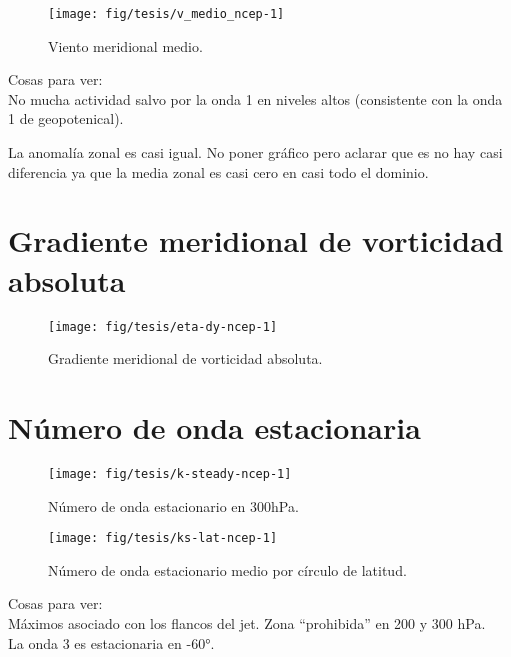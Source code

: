 \documentclass[spanish,a4paper]{book}
\begin{document}
\begin{figure}

{\centering \texttt{[image: fig/tesis/v\_medio\_ncep-1]} 

}

\caption{Viento meridional medio.}\label{fig:v_medio_ncep}
\end{figure}

Cosas para ver:\\
No mucha actividad salvo por la onda 1 en niveles altos (consistente con
la onda 1 de geopotenical).

La anomalía zonal es casi igual. No poner gráfico pero aclarar que es no
hay casi diferencia ya que la media zonal es casi cero en casi todo el
dominio.

\section{Gradiente meridional de vorticidad
absoluta}\label{gradiente-meridional-de-vorticidad-absoluta}

\begin{figure}

{\centering \texttt{[image: fig/tesis/eta-dy-ncep-1]} 

}

\caption{Gradiente meridional de vorticidad absoluta.}\label{fig:eta-dy-ncep}
\end{figure}

\section{Número de onda estacionaria}\label{numero-de-onda-estacionaria}

\begin{figure}
\texttt{[image: fig/tesis/k-steady-ncep-1]} \caption{Número de onda estacionario en 300hPa.}\label{fig:k-steady-ncep}
\end{figure}

\begin{figure}

{\centering \texttt{[image: fig/tesis/ks-lat-ncep-1]} 

}

\caption{Número de onda estacionario medio por círculo de latitud.}\label{fig:ks-lat-ncep}
\end{figure}

Cosas para ver:\\
Máximos asociado con los flancos del jet. Zona ``prohibida'' en 200 y
300 hPa.\\
La onda 3 es estacionaria en -60°.
\end{document}
